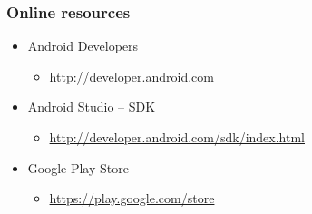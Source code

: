 %
%

\begin{frame}
  \frametitle{Online resources}
  
  \begin{itemize}
  \item<1-> Android Developers
    \begin{itemize}
    \item \url{http://developer.android.com}
    \end{itemize}
  \item<2-> Android Studio -- SDK
    \begin{itemize}
    \item \url{http://developer.android.com/sdk/index.html}
    \end{itemize}
  \item<3-> Google Play Store
    \begin{itemize}
    \item \url{ https://play.google.com/store }
    \end{itemize}
  \end{itemize}

\end{frame}

